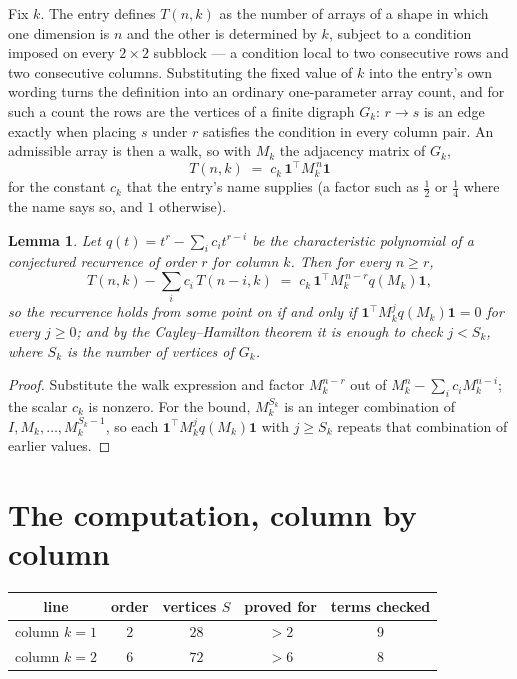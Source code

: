 \documentclass[11pt,a4paper]{article}
\theoremstyle{plain}
\newtheorem{lemma}[theorem]{Lemma}
\theoremstyle{definition}
\begin{document}
Fix $k$. The entry defines $T(n,k)$ as the number of arrays of a shape in which one dimension
is $n$ and the other is determined by $k$, subject to a condition imposed on every
$2\times2$ subblock --- a condition local to two consecutive rows and two consecutive columns.
Substituting the fixed value of $k$ into the entry's own wording turns the definition into an
ordinary one-parameter array count, and for such a count the rows are the vertices of a finite
digraph $G_k$: $r\to s$ is an edge exactly when placing $s$ under $r$ satisfies the condition
in every column pair. An admissible array is then a walk, so with $M_k$ the adjacency matrix
of $G_k$,
\[
T(n,k)\;=\;c_k\,\mathbf{1}^{\!\top}M_k^{\,n}\mathbf{1}
\]
for the constant $c_k$ that the entry's name supplies (a factor such as $\tfrac12$ or
$\tfrac14$ where the name says so, and $1$ otherwise).

\begin{lemma}\label{lem:crit}
Let $q(t)=t^{r}-\sum_i c_it^{r-i}$ be the characteristic polynomial of a conjectured
recurrence of order $r$ for column $k$. Then for every $n\ge r$,
\[
T(n,k)-\sum_i c_i\,T(n-i,k)\;=\;c_k\,\mathbf{1}^{\!\top}M_k^{\,n-r}q(M_k)\mathbf{1},
\]
so the recurrence holds from some point on if and only if
$\mathbf{1}^{\!\top}M_k^{j}q(M_k)\mathbf{1}=0$ for every $j\ge0$; and by the
Cayley--Hamilton theorem it is enough to check $j<S_k$, where $S_k$ is the number of vertices
of $G_k$.
\end{lemma}

\begin{proof}
Substitute the walk expression and factor $M_k^{n-r}$ out of $M_k^{n}-\sum_ic_iM_k^{n-i}$;
the scalar $c_k$ is nonzero. For the bound, $M_k^{S_k}$ is an integer combination of
$I,M_k,\dots,M_k^{S_k-1}$, so each $\mathbf{1}^{\!\top}M_k^{j}q(M_k)\mathbf{1}$ with
$j\ge S_k$ repeats that combination of earlier values.
\end{proof}

\section{The computation, column by column}

\begin{center}
\begin{tabular}{ccccc}
line & order & vertices $S$ & proved for & terms checked \\ \hline
column $k$$=1$ & $2$ & $28$ & $>2$ & $9$ \\
column $k$$=2$ & $6$ & $72$ & $>6$ & $8$ \\
\end{tabular}
\end{center}
\end{document}
